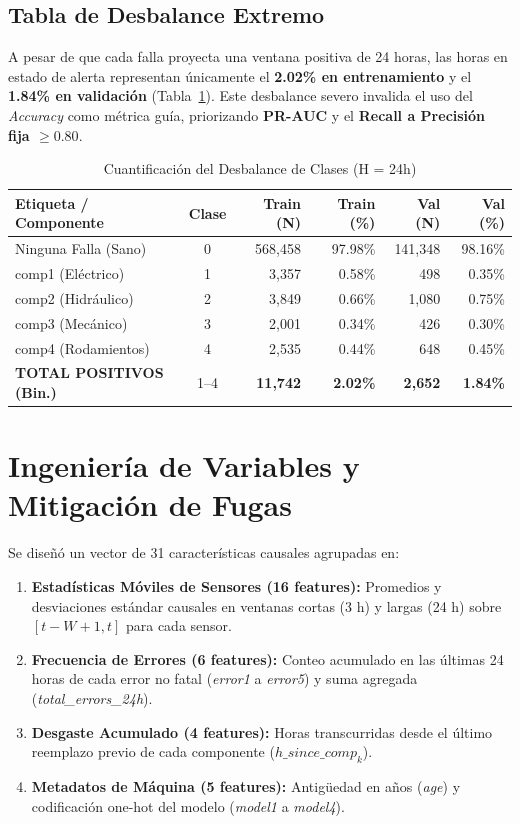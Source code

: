 \documentclass[conference]{IEEEtran}
\begin{document}
\subsection{Tabla de Desbalance Extremo}
A pesar de que cada falla proyecta una ventana positiva de 24 horas, las horas en estado de alerta representan únicamente el \textbf{2.02\% en entrenamiento} y el \textbf{1.84\% en validación} (Tabla~\ref{tab:desbalance}). Este desbalance severo invalida el uso del \textit{Accuracy} como métrica guía, priorizando \textbf{PR-AUC} y el \textbf{Recall a Precisión fija $\ge 0.80$}.

\begin{table}[htbp]
\caption{Cuantificación del Desbalance de Clases (H = 24h)}
\label{tab:desbalance}
\centering
\begin{tabular}{lcrrrr}
\toprule
\textbf{Etiqueta / Componente} & \textbf{Clase} & \textbf{Train (N)} & \textbf{Train (\%)} & \textbf{Val (N)} & \textbf{Val (\%)} \\
\midrule
Ninguna Falla (Sano) & 0 & 568,458 & 97.98\% & 141,348 & 98.16\% \\
comp1 (Eléctrico) & 1 & 3,357 & 0.58\% & 498 & 0.35\% \\
comp2 (Hidráulico) & 2 & 3,849 & 0.66\% & 1,080 & 0.75\% \\
comp3 (Mecánico) & 3 & 2,001 & 0.34\% & 426 & 0.30\% \\
comp4 (Rodamientos) & 4 & 2,535 & 0.44\% & 648 & 0.45\% \\
\midrule
\textbf{TOTAL POSITIVOS (Bin.)} & 1--4 & \textbf{11,742} & \textbf{2.02\%} & \textbf{2,652} & \textbf{1.84\%} \\
\bottomrule
\end{tabular}
\end{table}

\section{Ingeniería de Variables y Mitigación de Fugas}
Se diseñó un vector de 31 características causales agrupadas en:
\begin{enumerate}
    \item \textbf{Estadísticas Móviles de Sensores (16 features):} Promedios y desviaciones estándar causales en ventanas cortas (3 h) y largas (24 h) sobre $[t-W+1, t]$ para cada sensor.
    \item \textbf{Frecuencia de Errores (6 features):} Conteo acumulado en las últimas 24 horas de cada error no fatal (\textit{error1} a \textit{error5}) y suma agregada (\textit{total\_errors\_24h}).
    \item \textbf{Desgaste Acumulado (4 features):} Horas transcurridas desde el último reemplazo previo de cada componente ($h\_since\_comp_k$).
    \item \textbf{Metadatos de Máquina (5 features):} Antigüedad en años (\textit{age}) y codificación one-hot del modelo (\textit{model1} a \textit{model4}).
\end{enumerate}
\end{document}
